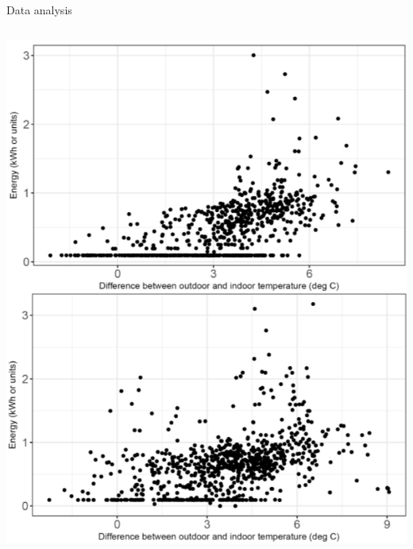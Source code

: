 \documentclass[aspectratio=169]{beamer}
\begin{document}
\begin{frame}{Data analysis}
    \begin{columns}
        \centering
        \includegraphics[scale = 0.20]{pic/hourly_energy_consume.png}


\end{columns}
\end{frame}
\end{document}
